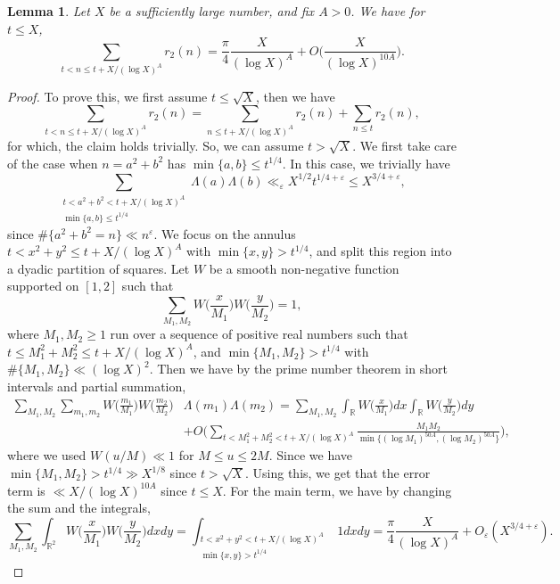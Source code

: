 \documentclass[12pt]{amsart}
\newtheorem{lem}[thm]{Lemma}
\theoremstyle{definition}
\theoremstyle{definition}
\theoremstyle{remark}
\numberwithin{equation}{section}
\newcommand{\R}{\mathbb{R}}
\renewcommand{\geq}{\geqslant}
\renewcommand{\leq}{\leqslant}
\begin{document}
\begin{lem}\label{prime_number_theorem_in_short_int}
Let $X$ be a sufficiently large number, and fix $A>0$. We have for $t\leq X$,
$$ \sum_{t<n\leq t + X/(\log X)^A} r_2(n) = \frac{\pi}{4} \frac{X}{(\log X)^A} + O\bigg( \frac{X}{(\log X)^{10A}} \bigg). $$
\end{lem}
\begin{proof}
To prove this, we first assume $t\leq \sqrt{X}$, then we  have
$$ \sum_{t<n\leq t + X/(\log X)^A} r_2(n)= \sum_{n\leq t + X/(\log X)^A} r_2(n) + \sum_{n\leq t} r_2(n), $$
for which, the claim holds trivially.
So, we can assume $t>\sqrt{X}$. We first take care of the case when $n=a^2+b^2$ has $\min\{a,b\} \leq t^{1/4}$. In this case, we trivially have
$$ \sum_{\substack{t<a^2+b^2<t+X/(\log X)^A \\ \min\{a,b\}\leq t^{1/4}}} \Lambda(a)\Lambda(b) \ll_{\varepsilon} X^{1/2}t^{1/4+\varepsilon} \leq X^{3/4+\varepsilon},  $$
since $\#\{a^2+b^2=n\} \ll n^{\varepsilon}$. We focus on the annulus $t < x^2+y^2 \leq t+X/(\log X)^A$ with $\min\{x,y\}>t^{1/4}$, and split this region into a dyadic partition of squares. Let $W$ be a smooth non-negative function supported on $[1,2]$ such that
$$ \sum_{M_1,M_2} W\bigg( \frac{x}{M_1} \bigg)W\bigg( \frac{y}{M_2} \bigg) = 1, $$
where $M_1,M_2\geq 1$ run over a sequence of positive real numbers such that $t\leq M_1^2+M_2^2 \leq t + X/(\log X)^A$, and $\min\{M_1,M_2\} > t^{1/4}$ with  $\#\{M_1,M_2\} \ll (\log X)^2$.
Then we have by the prime number theorem in short intervals and partial summation,
\begin{align*}
\sum_{M_1,M_2} \sum_{m_1,m_2} W\bigg( \frac{m_1}{M_1} \bigg)W\bigg( \frac{m_2}{M_2} \bigg)  &\Lambda(m_1) \Lambda(m_2) = \sum_{M_1,M_2} \int_{\R} W\bigg( \frac{x}{M_1} \bigg) dx \int_{\R}W\bigg( \frac{y}{M_2} \bigg) dy   \\
&+ O\bigg( \sum_{t<M_1^2+M_2^2<t+X/(\log X)^A} \frac{M_1M_2}{\min\{(\log M_1)^{50A} , (\log M_2)^{50A}\}} \bigg),
\end{align*}
where we used $W( u /M ) \ll 1$ for $M\leq u \leq 2M$.
Since we have $\min\{M_1,M_2\} > t^{1/4} \gg X^{1/8}$ since $t>\sqrt{X}$. Using this, we get that the error term is $\ll X/(\log X)^{10A}$ since $t\leq X$. For the main term, we have by changing the sum and the integrals,
$$ \sum_{M_1,M_2} \int_{\R^2} W\bigg( \frac{x}{M_1} \bigg) W\bigg( \frac{y}{M_2} \bigg) dxdy  = \int_{\substack{t<x^2+y^2 <t+X/(\log X)^A \\ \min\{x,y\} > t^{1/4}}} 1 dxdy = \frac{\pi}{4}\frac{X}{(\log X)^A} + O_{\varepsilon}(X^{3/4+\varepsilon}).$$
\end{proof}
\end{document}
